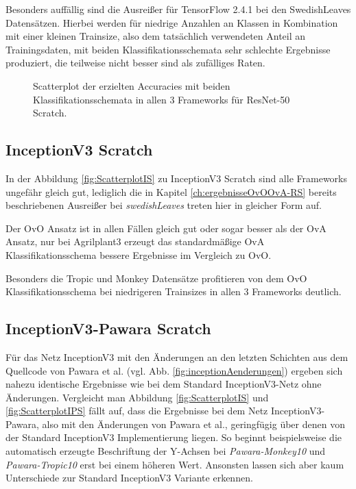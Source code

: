 Besonders auffällig sind die Ausreißer für TensorFlow 2.4.1 \cite{tensorflow} bei den SwedishLeaves \cite{swedishLeaves} Datensätzen. Hierbei werden für niedrige Anzahlen an Klassen in Kombination mit einer kleinen Trainsize, also dem tatsächlich verwendeten Anteil an Trainingsdaten, mit beiden Klassifikationsschemata sehr schlechte Ergebnisse produziert, die teilweise nicht besser sind als zufälliges Raten.
\begin{figure}[H]
\hspace*{-1.5cm}

\caption{Scatterplot der erzielten Accuracies mit beiden Klassifikationsschemata in allen 3 Frameworks für ResNet-50 Scratch.}
\label{fig:ScatterplotRS}
\end{figure}

\newpage

\subsection{InceptionV3 Scratch}
In der Abbildung \ref{fig:ScatterplotIS} zu InceptionV3 Scratch sind alle Frameworks ungefähr gleich gut, lediglich die in Kapitel \ref{ch:ergebnisseOvOOvA-RS} bereits beschriebenen Ausreißer bei \textit{swedishLeaves} \cite{swedishLeaves} treten hier in gleicher Form auf.

Der OvO Ansatz ist in allen Fällen gleich gut oder sogar besser als der OvA Ansatz, nur bei Agrilplant3 erzeugt das standardmäßige OvA Klassifikationsschema bessere Ergebnisse im Vergleich zu OvO.

Besonders die Tropic und Monkey \cite{pawaraWebsiteDatensaetze} Datensätze profitieren von dem OvO Klassifikationsschema bei niedrigeren Trainsizes in allen 3 Frameworks deutlich.


\subsection{InceptionV3-Pawara Scratch}
\label{ch:ergebnisseOvOOvA-IPS}
Für das Netz InceptionV3 mit den Änderungen an den letzten Schichten aus dem Quellcode von Pawara et al. \cite{pawaraWebsiteCode} (vgl. Abb. \ref{fig:inceptionAenderungen}) ergeben sich nahezu identische Ergebnisse wie bei dem Standard InceptionV3-Netz ohne Änderungen. Vergleicht man Abbildung \ref{fig:ScatterplotIS} und \ref{fig:ScatterplotIPS} fällt auf, dass die Ergebnisse bei dem Netz InceptionV3-Pawara, also mit den Änderungen von Pawara et al., geringfügig über denen von der Standard InceptionV3 Implementierung liegen. So beginnt beispielsweise die automatisch erzeugte Beschriftung der Y-Achsen bei \textit{Pawara-Monkey10} und \textit{Pawara-Tropic10} erst bei einem höheren Wert. Ansonsten lassen sich aber kaum Unterschiede zur Standard InceptionV3 Variante erkennen.


